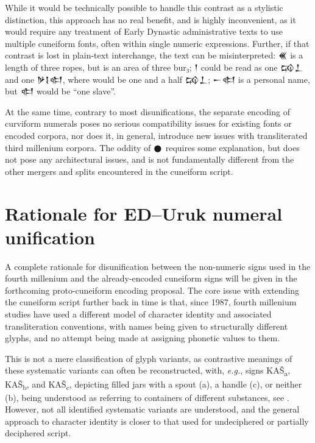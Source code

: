 \documentclass[10pt, a4paper, twoside]{article}
\newcommand\oneAšC{{\proposalfont\symbol{"12550}}} %
\newcommand\oneDišC{{\proposalfont\symbol{"12559}}}
\newcommand\threeUC{{\proposalfont\symbol{"12564}}}
\newcommand{\exempligratia}{\emph{e.g.}}
\begin{document}
While it would be technically possible to handle this contrast as
a stylistic distinction, this approach has no real benefit, and
is highly inconvenient, as it would require any treatment of Early
Dynastic administrative texts to use multiple cuneiform fonts, often within
single numeric expressions.
Further, if that contrast is lost in plain-text interchange, the text can
be misinterpreted:
{\xsuxfont 𒌍} is a length of three ropes, but \threeUC{} is an area of three bur₃;
{\oneAšC\xsuxfont 𒁹} could be read as one {\xsuxfont 𒄘𒁇} and one {\xsuxfont 𒃻𒋙𒊕},
where {\oneAšC\oneDišC} would be one and a half {\xsuxfont 𒄘𒁇};
{\xsuxfont 𒀸𒊕} is a personal name, but {\oneAšC\xsuxfont 𒊕} would be ``one slave''.

At the same time, contrary to most disunifications,
the separate encoding of curviform numerals poses no serious compatibility issues
for existing fonts or encoded corpora,
nor does it, in general,
introduce new issues with transliterated third millenium corpora.
The oddity of {\originalNoto 𒊹} requires some explanation,
but does not pose any architectural issues,
and is not fundamentally different from the other mergers and splits
encountered in the cuneiform script.

\section{Rationale for ED–Uruk numeral unification}
\label{unificationRationale}
A complete rationale for disunification between the non-numeric signs used
in the fourth millenium and the already-encoded cuneiform signs will
be given in the forthcoming proto-cuneiform encoding proposal.
The core issue with extending the cuneiform script further back in time
is that, since 1987, fourth millenium studies have used a different model
of character identity and associated transliteration conventions,
with names being given to structurally different glyphs, and no attempt being made
at assigning phonetic values to them.

This is not a mere classification of glyph variants, as contrastive meanings
of these systematic variants can often be reconstructed,
with, \exempligratia, signs KAŠ\textsubscript{a}, KAŠ\textsubscript{b}, and
KAŠ\textsubscript{c}, depicting filled jars with a spout (a), a handle (c),
or neither (b), being understood as referring to containers of different substances,
see \cite[34\psq]{Englund2001}.
However, not all identified systematic variants are understood, and the general
approach to character identity is closer to that used for undeciphered or
partially deciphered script.
\end{document}

